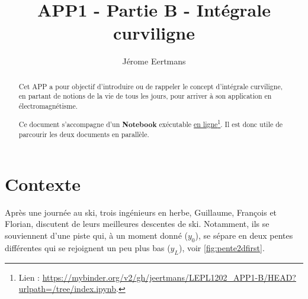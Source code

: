 \documentclass{cup-pan}
\author{Jérome Eertmans}
\title{APP1 - Partie B - Intégrale curviligne}
\date{}
\begin{document}
\maketitle

\begin{abstract}

Cet APP a pour objectif d'introduire ou de rappeler le concept d'intégrale curviligne, en partant de notions de la vie de tous les jours, pour arriver à son application en électromagnétisme.

Ce document s'accompagne d'un \textbf{Notebook} exécutable \href{https://mybinder.org/v2/gh/jeertmans/LEPL1202_APP1-B/HEAD?urlpath=/tree/index.ipynb}{en ligne}\footnote{Lien : \url{https://mybinder.org/v2/gh/jeertmans/LEPL1202_APP1-B/HEAD?urlpath=/tree/index.ipynb}.}. Il est donc utile de parcourir les deux documents en parallèle.

\end{abstract}

\section{Contexte}

Après une journée au ski, trois ingénieurs en herbe, Guillaume, François et Florian, discutent de leurs meilleures descentes de ski. Notamment, ils se souviennent d'une piste qui, à un moment donné ($y_0$), se sépare en deux pentes différentes qui se rejoignent un peu plus bas ($y_L$), voir \autoref{fig:pente2dfirst}. 
\end{document}
